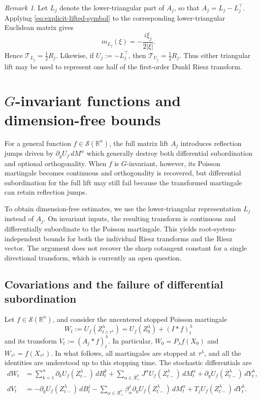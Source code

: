 \documentclass[11pt]{amsart}
\theoremstyle{definition}
\theoremstyle{remark}
\newtheorem{remark}[theorem]{Remark}
\numberwithin{equation}{section}
\newcommand{\R}{\mathbb{R}}
\newcommand{\RR}{\mathcal{R}}
\begin{document}
\begin{remark}
Let $L_j$ denote the lower-triangular part of $A_j$, so that $A_j=L_j-L_j^\top$. Applying \eqref{eq:explicit-lifted-symbol} to the corresponding lower-triangular Euclidean matrix gives
\[
m_{L_j}(\xi)=-\frac{i\xi_j}{2|\xi|}.
\]
Hence $\mathcal T_{L_j}=\frac12R_j$.
Likewise, if $U_j:=-L_j^\top$, then $\mathcal T_{U_j}=\frac12R_j$. Thus either triangular lift may be used to represent one half of the first-order Dunkl Riesz transform.
\end{remark}

\section{$G$-invariant functions and dimension-free bounds}
\label{sec:invariant-sharp-bounds}
For a general function $f\in\mathcal S(\R^n)$, the full matrix lift $A_j$ introduces reflection jumps driven by $\partial_yU_f\,dM^\alpha$ which generally destroy both differential subordination and optional orthogonality. When $f$ is $G$-invariant, however, its Poisson martingale becomes continuous and orthogonality is recovered, but differential subordination for the full lift may still fail because the transformed martingale can retain reflection jumps.

To obtain dimension-free estimates, we use the lower-triangular representation $L_j$ instead of $A_j$. On invariant inputs, the resulting transform is continuous and differentially subordinate to the Poisson martingale. This yields root-system-independent bounds for both the individual Riesz transforms and the Riesz vector. The argument does not recover the sharp cotangent constant for a single directional transform, which is currently an open question.

\subsection{Covariations and the failure of differential subordination}

Let $f\in\mathcal S(\R^n)$, and consider the uncentered stopped Poisson martingale
\[
W_t:=U_f(Z_{t\wedge\tau^\lambda}^\lambda)
=U_f(Z_0^\lambda)+(I\ast f)_t^\lambda
\]
and its transform $V_t:=(A_j\ast f)_t^\lambda$. In particular,
$W_0=P_\lambda f(X_0)$ and $W_{\tau^\lambda}=f(X_{\tau^\lambda})$.
In what follows, all martingales are stopped at $\tau^\lambda$, and all the identities are understood up to this stopping time. The stochastic differentials are
\begin{align*}
dW_t
&=
\sum_{k=1}^n\partial_kU_f(Z_{t-}^\lambda)\,dB_t^k
+
\sum_{\alpha\in\RR_+^\kappa}J^\alpha U_f(Z_{t-}^\lambda)\,dM_t^\alpha
+
\partial_yU_f(Z_{t-}^\lambda)\,dY_t^\lambda,\\
dV_t
&=
-\partial_yU_f(Z_{t-}^\lambda)\,dB_t^j
-
\sum_{\alpha\in\RR_+^\kappa}\beta_\alpha^j\partial_yU_f(Z_{t-}^\lambda)\,dM_t^\alpha
+
T_jU_f(Z_{t-}^\lambda)\,dY_t^\lambda.
\end{align*}
\end{document}
